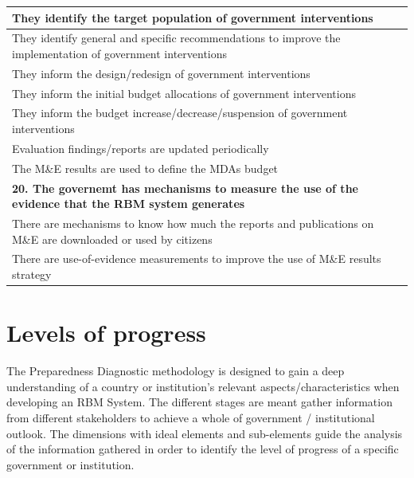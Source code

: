 \documentclass[
  10pt,
]{book}
\begin{document}
\begin{table}
\begin{tabular}[t]{l}
\hline
\hspace{1em}They identify the target population of government interventions\\
\hline
\hspace{1em}They identify general and specific recommendations to improve the implementation of government interventions\\
\hline
\hspace{1em}They inform the design/redesign of government interventions\\
\hline
\hspace{1em}They inform the initial budget allocations of government interventions\\
\hline
\hspace{1em}They inform the budget increase/decrease/suspension of government interventions\\
\hline
\hspace{1em}Evaluation findings/reports are updated periodically\\
\hline
\hspace{1em}The M\&E results are used to define the MDAs budget\\
\hline
\multicolumn{1}{l}{\textbf{20. The governemt has mechanisms to measure the use of the evidence that the RBM system generates}}\\
\hline
\hspace{1em}There are mechanisms to know how much the reports and publications on M\&E are downloaded or used by citizens\\
\hline
\hspace{1em}There are use-of-evidence measurements to improve the use of M\&E results strategy\\
\hline
\end{tabular}
\end{table}

\hypertarget{levels-of-progress}{%
\section{Levels of progress}\label{levels-of-progress}}

The Preparedness Diagnostic methodology is designed to gain a deep understanding of a country or institution's relevant aspects/characteristics when developing an RBM System. The different stages are meant gather information from different stakeholders to achieve a whole of government / institutional outlook. The dimensions with ideal elements and sub-elements guide the analysis of the information gathered in order to identify the level of progress of a specific government or institution.
\end{document}
